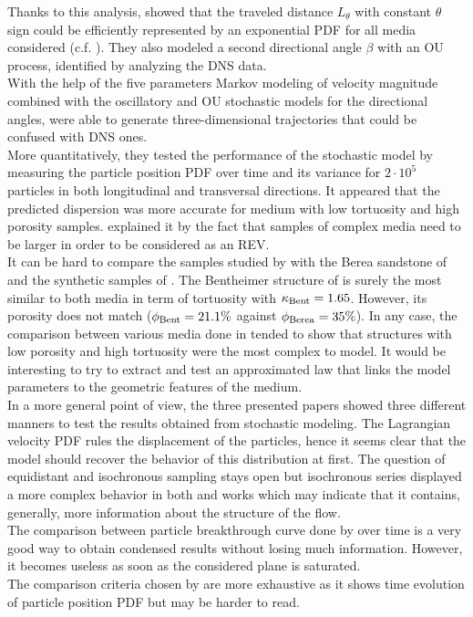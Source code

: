 Thanks to this analysis, \citeauthor{Meyer2016} showed that the traveled distance $L_\theta$ with constant $\theta$ sign could be efficiently represented by an exponential PDF for all media considered (c.f. \citet[Fig- 12]{Meyer2016}). They also modeled a second directional angle $\beta$ with an OU process, identified by analyzing the DNS data.\\
With the help of the five parameters Markov modeling of velocity magnitude combined with the oscillatory and OU stochastic models for the directional angles, \citet{Meyer2016} were able to generate three-dimensional trajectories that could be confused with DNS ones. \\
More quantitatively, they tested the performance of the stochastic model by measuring the particle position PDF over time and its variance for $2\cdot10^5$ particles in both longitudinal and transversal directions.
It appeared that the predicted dispersion was more accurate for medium with low tortuosity and high porosity samples. 
\cite{Meyer2016} explained it by the fact that samples of complex media need to be larger in order to be considered as an REV.\\

It can be hard to compare the samples studied by \citeauthor{Meyer2016} with the Berea sandstone of \citet{Dentz2017} and the synthetic samples of \citet{Puyguiraud2019}. 
The Bentheimer structure of \citet{Meyer2016} is surely the most similar to both media in term of tortuosity with $\kappa_{\rm{Bent}}=1.65$. 
However, its porosity does not match ($\phi_{\rm{Bent}}=21.1\%$ against $\phi_{\rm{Berea}}=35\%$).
In any case, the comparison between various media done in \citet{Meyer2016} tended to show that structures with low porosity and high tortuosity were the most complex to model. 
It would be interesting to try to extract and test an approximated law that links the model parameters to the geometric features of the medium.\\

In a more general point of view, the three presented papers showed three different manners to test the results obtained from stochastic modeling. 
The Lagrangian velocity PDF rules the displacement of the particles, hence it seems clear that the model should recover the behavior of this distribution at first.
The question of equidistant and isochronous sampling stays open but isochronous series displayed a more complex behavior in both \citet{Meyer2016} and \citet{Puyguiraud2019} works which may indicate that it contains, generally, more information about the structure of the flow.\\
The comparison between particle breakthrough curve done by \citet{Dentz2017} over time is a very good way to obtain condensed results without losing much information. However, it becomes useless as soon as the considered plane is saturated.\\
The comparison criteria chosen by \citet{Meyer2016} are more exhaustive as it shows time evolution of particle position PDF but may be harder to read.\\

